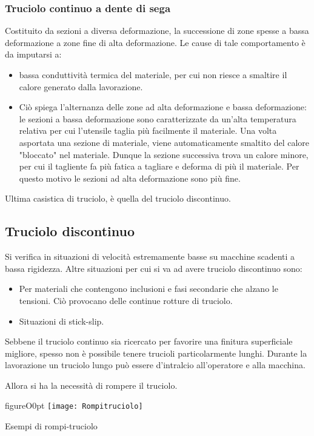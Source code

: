 \subsubsection{Truciolo continuo a dente di sega}
Costituito da sezioni a diversa deformazione, la successione di zone spesse a bassa deformazione a zone fine di alta deformazione.
Le cause di tale comportamento è da imputarsi a:
\begin{itemize}
\item bassa conduttività termica del materiale,
per cui non riesce a smaltire il calore generato dalla lavorazione. 
\item Ciò spiega l'alternanza delle zone ad alta deformazione e bassa deformazione: le sezioni a bassa deformazione sono caratterizzate da un'alta temperatura relativa per cui l'utensile taglia
più facilmente il materiale. Una volta asportata una sezione di materiale, viene automaticamente smaltito
del calore "bloccato" nel materiale. Dunque la sezione successiva trova un calore minore, per cui il 
tagliente fa più fatica a tagliare e deforma di più 
il materiale. Per questo motivo le sezioni ad alta 
deformazione sono più fine.
\end{itemize}
Ultima casistica di truciolo, è quella del truciolo 
discontinuo.

\subsection{Truciolo discontinuo}
Si verifica in situazioni di velocità estremamente
basse su macchine scadenti a bassa rigidezza.
Altre situazioni per cui si va ad avere truciolo 
discontinuo sono:
\begin{itemize}
\item Per materiali che contengono inclusioni e fasi
secondarie che alzano le tensioni. Ciò provocano delle continue rotture di truciolo.
\item Situazioni di stick-slip.
\end{itemize}

Sebbene il truciolo continuo sia ricercato per favorire una finitura superficiale migliore, spesso
non è possibile tenere trucioli particolarmente lunghi. Durante la lavorazione un truciolo lungo
può essere d'intralcio all'operatore e alla macchina.

Allora si ha la necessità di rompere il truciolo.

\begin{wrapfloat}{figure}{O}{0pt}
\texttt{[image: Rompitruciolo]}
\caption{Esempi di rompi-truciolo}
\label{fig:Rompitruciolo}
\end{wrapfloat}


